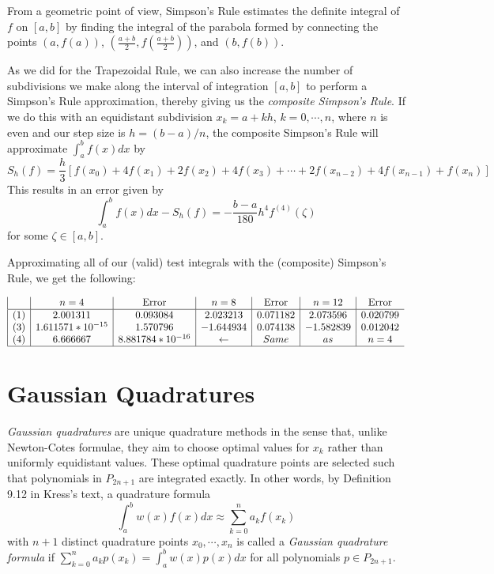 \documentclass[a4paper,draft]{amsproc}
\theoremstyle{plain}
\theoremstyle{definition}
\theoremstyle{remark}
\numberwithin{equation}{section}
\begin{document}
From a geometric point of view, Simpson's Rule estimates the definite integral of $f$ on $[a, b]$ by finding the integral of the parabola formed by connecting the points $(a, f(a))$, $\left(\displaystyle\frac{a+b}{2}, f\left(\frac{a+b}{2}\right)\right)$, and $(b, f(b))$.

As we did for the Trapezoidal Rule, we can also increase the number of subdivisions we make along the interval of integration $[a, b]$ to perform a Simpson's Rule approximation, thereby giving us the \emph{composite Simpson's Rule}. If we do this with an equidistant subdivision $x_k=a+kh$, $k=0, \cdots, n$, where $n$ is even and our step size is $h=(b-a)/n$, the composite Simpson's Rule will approximate $\displaystyle\int_{a}^{b}f(x)dx$ by
\[
S_h(f)=\displaystyle\frac{h}{3}[f(x_0)+4f(x_1)+2f(x_2)+4f(x_3)+\cdots+2f(x_{n-2})+4f(x_{n-1})+f(x_n)]
\]
This results in an error given by
\[
\displaystyle\int_{a}^{b}f(x)dx-S_h(f)=-\frac{b-a}{180}h^4f^{(4)}(\zeta)
\]
for some $\zeta\in [a, b]$.

Approximating all of our (valid) test integrals with the (composite) Simpson's Rule, we get the following:

\begin{displaymath}
\begin{array}{|c|c|c|c|c|c|c}

 & n=4
 & \text{Error}
 & n=8
 & \text{Error}
 & n=12
 & \text{Error} \\
\hline
(1) & 2.001311 & 0.093084 & 2.023213 & 0.071182 & 2.073596 & 0.020799 \\
(3) & 1.611571*10^{-15} & 1.570796 & -1.644934 & 0.074138 & -1.582839 & 0.012042 \\
(4) & 6.666667 & 8.881784*10^{-16} & \leftarrow & Same & as & n=4 \\
\hline
\end{array}
\end{displaymath}

\section{Gaussian Quadratures}

\emph{Gaussian quadratures} are unique quadrature methods in the sense that, unlike Newton-Cotes formulae, they aim to choose optimal values for $x_k$ rather than uniformly equidistant values. These optimal quadrature points are selected such that polynomials in $P_{2n+1}$ are integrated exactly. In other words, by Definition 9.12 in Kress's text, a quadrature formula
\[
\displaystyle\int_{a}^{b}w(x)f(x)dx\approx\sum_{k=0}^{n}a_kf(x_k)
\]
with $n+1$ distinct quadrature points $x_0, \cdots, x_n$ is called a \emph{Gaussian quadrature formula} if $\displaystyle\sum_{k=0}^{n}a_kp(x_k)=\int_{a}^{b}w(x)p(x)dx$ for all polynomials $p\in P_{2n+1}$.
\end{document}
